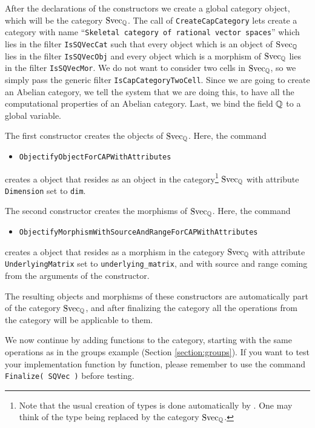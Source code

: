 After the declarations of the constructors we create a global category \GAP object, which will be the category $\mathrm{Svec}_{\mathbb{Q}}$.
The call of \texttt{CreateCapCategory} lets \CapPkg create a category with name
``\texttt{Skeletal category of rational vector spaces}'' which lies in the filter \texttt{IsSQVecCat}
such that every \GAP object which is an object of $\mathrm{Svec}_{\mathbb{Q}}$ lies in the filter \texttt{IsSQVecObj}
and every \GAP object which is a morphism of $\mathrm{Svec}_{\mathbb{Q}}$ lies in the filter \texttt{IsSQVecMor}.
We do not want to consider two cells in $\mathrm{Svec}_{\mathbb{Q}}$, so we simply pass the generic filter \texttt{IsCapCategoryTwoCell}.
Since we are going to create an Abelian category, we tell the system that we are doing this, to have all the computational
properties of an Abelian category.
Last, we bind the field $\mathbb{Q}$ to a global variable.



The first constructor creates the objects of $\mathrm{Svec}_{\mathbb{Q}}$.
Here, the \CapPkg command
\begin{itemize}
  \item \texttt{ObjectifyObjectForCAPWithAttributes}
\end{itemize}
creates a \GAP object that resides as an object in the category\footnote{
  Note that the usual creation of \GAP types is done automatically by \CapPkg.
One may think of the \GAP type being replaced by the category $\mathrm{Svec}_{\mathbb{Q}}$.
}
$\mathrm{Svec}_{\mathbb{Q}}$ with attribute \texttt{Dimension} set to \texttt{dim}.

The second constructor creates the morphisms of $\mathrm{Svec}_{\mathbb{Q}}$.
Here, the \CapPkg command
\begin{itemize}
  \item \texttt{ObjectifyMorphismWithSourceAndRangeForCAPWithAttributes}
\end{itemize}
creates a \GAP object that resides as a morphism in the category
$\mathrm{Svec}_{\mathbb{Q}}$ with attribute \texttt{UnderlyingMatrix} set to \texttt{underlying\_matrix},
and with source and range coming from the arguments of the constructor.

The resulting objects and morphisms of these constructors
are automatically part of the category $\mathrm{Svec}_{\mathbb{Q}}$, and after finalizing the category all the operations from the
category will be applicable to them.

We now continue by adding functions to the category, starting with the same operations as in the groups example (Section \ref{section:groups}).
If you want to test your implementation function by function,
please remember to use the command \texttt{Finalize( SQVec )}
before testing. 

